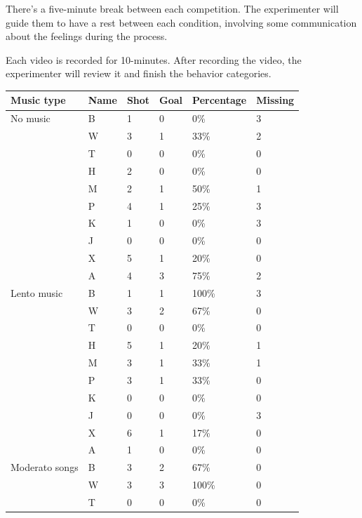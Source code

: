\documentclass{article}
\begin{document}
There's a five-minute break between each competition. The experimenter will guide them to have a rest between each condition, involving some communication about the feelings during the process.

Each video is recorded for 10-minutes. After recording the video, the experimenter will review it and finish the behavior categories.

\begin{table}[h]
\centering
    \begin{tabular}{@{}llllll@{}}
        \toprule
	Music type & Name & Shot & Goal & Percentage & Missing\\
        \midrule
        No music & B & 1 & 0 & 0\% & 3 \\
                 & W & 3 & 1 & 33\% & 2 \\
                 & T & 0 & 0 & 0\% & 0 \\
                 & H & 2 & 0 & 0\% & 0 \\
                 & M & 2 & 1 & 50\% & 1 \\
                 & P & 4 & 1 & 25\% & 3 \\
                 & K & 1 & 0 & 0\% & 3 \\
                 & J & 0 & 0 & 0\% & 0 \\
                 & X & 5 & 1 & 20\% & 0 \\
                 & A & 4 & 3 & 75\% & 2 \\
        \midrule
        Lento music & B & 1 & 1 & 100\% & 3 \\
                    & W & 3 & 2 & 67\% & 0 \\
                    & T & 0 & 0 & 0\% & 0 \\
                    & H & 5 & 1 & 20\% & 1 \\
                    & M & 3 & 1 & 33\% & 1 \\
                    & P & 3 & 1 & 33\% & 0 \\
                    & K & 0 & 0 & 0\% & 0 \\
                    & J & 0 & 0 & 0\% & 3 \\
                    & X & 6 & 1 & 17\% & 0 \\
                    & A & 1 & 0 & 0\% & 0 \\
        \midrule
        Moderato songs & B & 3 & 2 & 67\% & 0 \\
                       & W & 3 & 3 & 100\% & 0 \\
                       & T & 0 & 0 & 0\% & 0 \\

\end{tabular}
\end{table}
\end{document}
